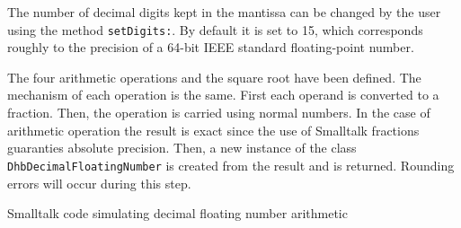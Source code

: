 \documentclass[twoside]{book}
\begin{document}
The number of decimal digits kept in the mantissa can be changed
by the user using the method {\tt setDigits:}. By default it is
set to 15, which corresponds roughly to the precision of a 64-bit
IEEE standard floating-point number.

The four arithmetic operations and the square root have been
defined. The mechanism of each operation is the same. First each
operand is converted to a fraction. Then, the operation is carried
using normal numbers. In the case of arithmetic operation the
result is exact since the use of Smalltalk fractions guaranties
absolute precision. Then, a new instance of the class {\tt
DhbDecimalFloatingNumber} is created from the result and is
returned. Rounding errors will occur during this step.

\begin{listing} Smalltalk code
simulating decimal floating number arithmetic \label{ls:testst}

\end{listing}


\ifx\wholebook\relax\else
\end{document}
